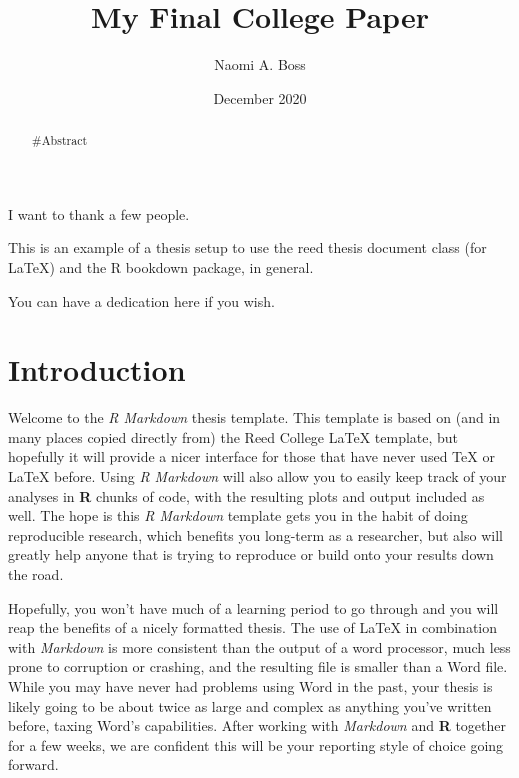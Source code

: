 \documentclass[12pt,twoside]{reedthesis}
\title{My Final College Paper}
\author{Naomi A. Boss}
\date{December 2020}
\begin{document}
  \maketitle

\frontmatter %
\pagestyle{empty} %
  \begin{acknowledgements}
    I want to thank a few people.
  \end{acknowledgements}
  \begin{preface}
    This is an example of a thesis setup to use the reed thesis document class
    (for LaTeX) and the R bookdown package, in general.
  \end{preface}
  \hypersetup{linkcolor=black}
  \setcounter{tocdepth}{2}
  \tableofcontents

  \listoftables

  \listoffigures
  \begin{abstract}
    \#Abstract
  \end{abstract}
  \begin{dedication}
    You can have a dedication here if you wish.
  \end{dedication}
\mainmatter %
\pagestyle{fancyplain} %

\hypertarget{introduction}{%
\chapter*{Introduction}\label{introduction}}

Welcome to the \emph{R Markdown} thesis template. This template is based on (and in many places copied directly from) the Reed College LaTeX template, but hopefully it will provide a nicer interface for those that have never used TeX or LaTeX before. Using \emph{R Markdown} will also allow you to easily keep track of your analyses in \textbf{R} chunks of code, with the resulting plots and output included as well. The hope is this \emph{R Markdown} template gets you in the habit of doing reproducible research, which benefits you long-term as a researcher, but also will greatly help anyone that is trying to reproduce or build onto your results down the road.

Hopefully, you won't have much of a learning period to go through and you will reap the benefits of a nicely formatted thesis. The use of LaTeX in combination with \emph{Markdown} is more consistent than the output of a word processor, much less prone to corruption or crashing, and the resulting file is smaller than a Word file. While you may have never had problems using Word in the past, your thesis is likely going to be about twice as large and complex as anything you've written before, taxing Word's capabilities. After working with \emph{Markdown} and \textbf{R} together for a few weeks, we are confident this will be your reporting style of choice going forward.
\end{document}
